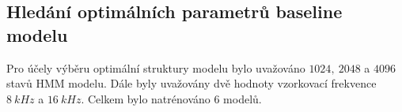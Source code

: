 \subsection{Hledání optimálních parametrů baseline modelu}
\label{chap:construction:results:baseline}


Pro účely výběru optimální struktury modelu bylo uvažováno $1024,\ 2048$ a $4096$ stavů HMM modelu. Dále byly uvažovány dvě hodnoty vzorkovací frekvence $8\ kHz$ a $16\ kHz$. Celkem bylo natrénováno $6$ modelů.



